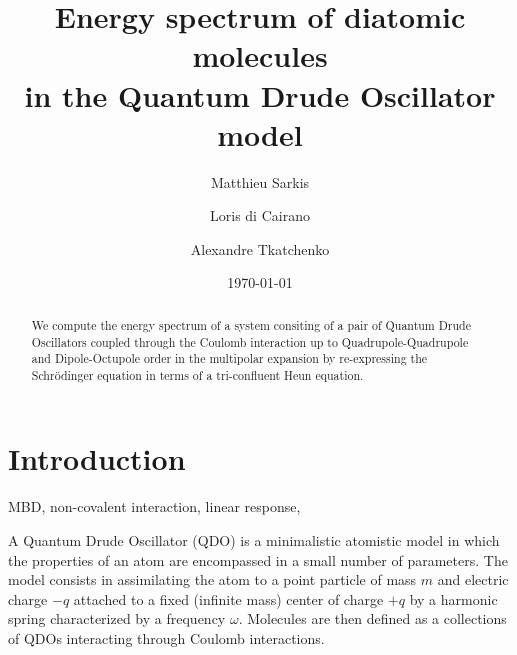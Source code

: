 \documentclass[reprint, amsmath, amssymb, aps, prl]{revtex4-2}
\begin{document}

\title{Energy spectrum of diatomic molecules\\ in the Quantum Drude Oscillator model}

\author{Matthieu Sarkis}

\author{Loris di Cairano}%

\author{Alexandre Tkatchenko}%



\date{\today}

\begin{abstract}

    We compute the energy spectrum of a system consiting of a pair of Quantum Drude Oscillators coupled through the Coulomb interaction up to Quadrupole-Quadrupole and Dipole-Octupole order in the multipolar expansion by re-expressing the Schr\"odinger equation in terms of a tri-confluent Heun equation.

\end{abstract}

\maketitle


\section{Introduction}

    MBD, non-covalent interaction, linear response,

    A Quantum Drude Oscillator (QDO) is a minimalistic atomistic model in which the properties of an atom are encompassed in a small number of parameters. The model consists in assimilating the atom to a point particle of mass $m$ and electric charge $-q$ attached to a fixed (infinite mass) center of charge $+q$ by a harmonic spring characterized by a frequency $\omega$. Molecules are then defined as a collections of QDOs interacting through Coulomb interactions.
\end{document}
